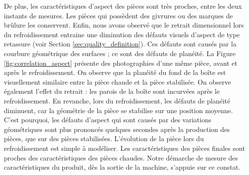 De plus, les caractéristiques d'aspect des pièces sont très proches, entre les deux instants de mesures.
Les pièces qui possèdent des givrures ou des marques de brûlure les conservent.
Enfin, nous avons observé que le retrait dimensionnel lors du refroidissement entraine une diminution des défauts visuels d'aspect de type retassure (voir Section \ref{sec:quality_definition}).
Ces défauts sont causés par la courbure géométrique des surfaces ; ce sont des défauts de planéité.
La Figure \ref{fig:correlation_aspect} présente des photographies d'une même pièce, avant et après le refroidissement.
On observe que la planéité du fond de la boîte est visuellement similaire entre la pièce chaude et la pièce stabilisée.
On observe également l'effet du retrait : les parois de la boîte sont incurvées après le refroidissement.
En revanche, lors du refroidissement, les défauts de planéité diminuent, car la géométrie de la pièce se stabilise sur une position moyenne.
C'est pourquoi, les défauts d'aspect qui sont causés par des variations géométriques sont plus prononcés quelques secondes après la production des pièces, que sur des pièces stabilisées.
L'évolution de la pièce lors du refroidissement est simple à modéliser.
Les caractéristiques des pièces finales sont proches des caractéristiques des pièces chaudes.
Notre démarche de mesure des caractéristiques du produit, dès la sortie de la machine, s'appuie sur ce constat.

\bigskip

\bigskip

\bigskip

\bigskip

